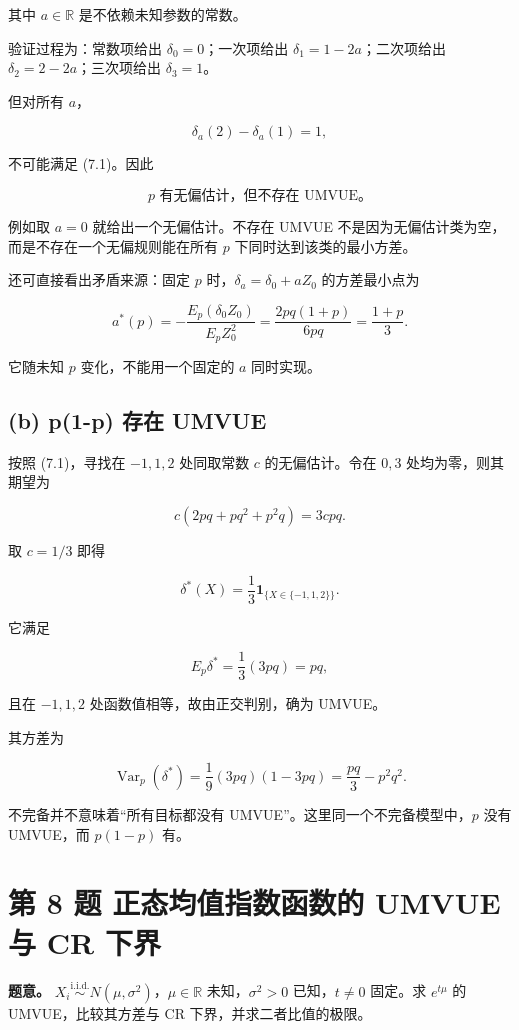 其中 $a\in\mathbb R$ 是不依赖未知参数的常数。

验证过程为：常数项给出 $\delta_0=0$；一次项给出 $\delta_1=1-2a$；二次项给出 $\delta_2=2-2a$；三次项给出 $\delta_3=1$。

但对所有 $a$，

\[
\delta_a(2)-\delta_a(1)=1,
\]

不可能满足 (7.1)。因此

\[
\boxed{p\text{ 有无偏估计，但不存在 UMVUE。}}
\]

例如取 $a=0$ 就给出一个无偏估计。不存在 UMVUE 不是因为无偏估计类为空，而是不存在一个无偏规则能在所有 $p$ 下同时达到该类的最小方差。

还可直接看出矛盾来源：固定 $p$ 时，$\delta_a=\delta_0+aZ_0$ 的方差最小点为

\[
a^*(p)=-\frac{E_p(\delta_0 Z_0)}{E_pZ_0^2}
=\frac{2pq(1+p)}{6pq}
=\frac{1+p}{3}.
\]

它随未知 $p$ 变化，不能用一个固定的 $a$ 同时实现。

\subsection{(b) p(1-p) 存在 UMVUE}

按照 (7.1)，寻找在 $-1,1,2$ 处同取常数 $c$ 的无偏估计。令在 $0,3$ 处均为零，则其期望为

\[
c(2pq+pq^2+p^2q)=3cpq.
\]

取 $c=1/3$ 即得

\[
\boxed{\delta^*(X)=\frac13\mathbf1_{\{X\in\{-1,1,2\}\}}.}
\]

它满足

\[
E_p\delta^*=\frac13(3pq)=pq,
\]

且在 $-1,1,2$ 处函数值相等，故由正交判别，确为 UMVUE。

其方差为

\[
\boxed{\operatorname{Var}_p(\delta^*)
=\frac19(3pq)(1-3pq)
=\frac{pq}{3}-p^2q^2.}
\]

 不完备并不意味着“所有目标都没有 UMVUE”。这里同一个不完备模型中，$p$ 没有 UMVUE，而 $p(1-p)$ 有。

\section{第 8 题 正态均值指数函数的 UMVUE 与 CR 下界}

\textbf{题意。} $X_i\overset{\mathrm{i.i.d.}}{\sim}N(\mu,\sigma^2)$，$\mu\in\mathbb R$ 未知，$\sigma^2>0$ 已知，$t\ne0$ 固定。求 $e^{t\mu}$ 的 UMVUE，比较其方差与 CR 下界，并求二者比值的极限。

